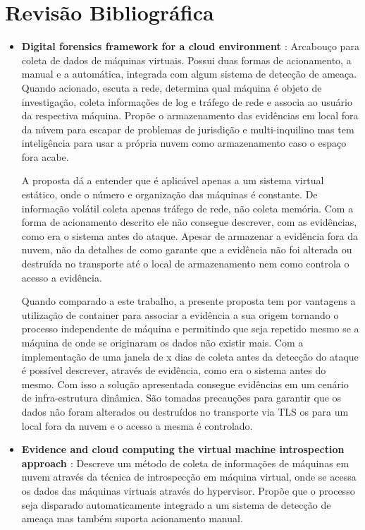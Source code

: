 \documentclass[
	12pt,				%
	openright,			%
	oneside,			%
	a4paper,			%
	english,			%
	french,				%
	spanish,			%
	brazil,				%
	]{abntex2}
\begin{document}
\chapter{Revisão Bibliográfica}

\begin{itemize}

\item \textbf{Digital forensics framework for a cloud environment \cite{George2012} }: Arcabouço para coleta de dados de máquinas virtuais. Possui duas formas de 
acionamento, a manual e a automática, integrada com algum sistema de detecção de ameaça. Quando acionado, escuta a rede, determina qual máquina é objeto de investigação, 
coleta informações de log e tráfego de rede e associa ao usuário da respectiva máquina. Propõe o armazenamento das evidências em local fora da núvem para escapar de 
problemas de jurisdição e multi-inquilino mas tem inteligência para usar a própria nuvem como armazenamento caso o espaço fora acabe.

A proposta dá a entender que é aplicável apenas a um sistema virtual estático, onde o número e organização das máquinas é constante. De informação volátil coleta apenas 
tráfego de rede, não coleta memória. Com a forma de acionamento descrito ele não consegue descrever, com as evidências, como era o sistema antes do ataque. Apesar de armazenar 
a evidência fora da nuvem, não da detalhes de como garante que a evidência não foi alterada ou destruída no transporte até o local de armazenamento nem como controla o 
acesso a evidência.

Quando comparado a este trabalho, a presente proposta tem por vantagens a utilização de container para associar a evidência a sua origem tornando o processo independente 
de máquina e permitindo que seja repetido mesmo se a máquina de onde se originaram os dados não existir mais. Com a implementação de uma janela de x dias de coleta antes da
detecção do ataque é possível descrever, através de evidência, como era o sistema antes do mesmo. Com isso a solução apresentada consegue evidências em um cenário de
infra-estrutura dinâmica. São tomadas precauções para garantir que os dados não foram alterados ou destruídos no transporte via TLS os para um local fora da nuvem e 
o acesso a mesma é controlado.\\
 
\item \textbf{Evidence and cloud computing the virtual machine introspection approach \cite{Poisel2013} }: Descreve um método de coleta de informações de máquinas
em nuvem através da técnica de introspecção em máquina virtual, onde se acessa os dados das máquinas virtuais através do hypervisor. Propõe que o processo seja disparado
automaticamente integrado a um sistema de detecção de ameaça mas também suporta acionamento manual.


\end{itemize}
\end{document}

